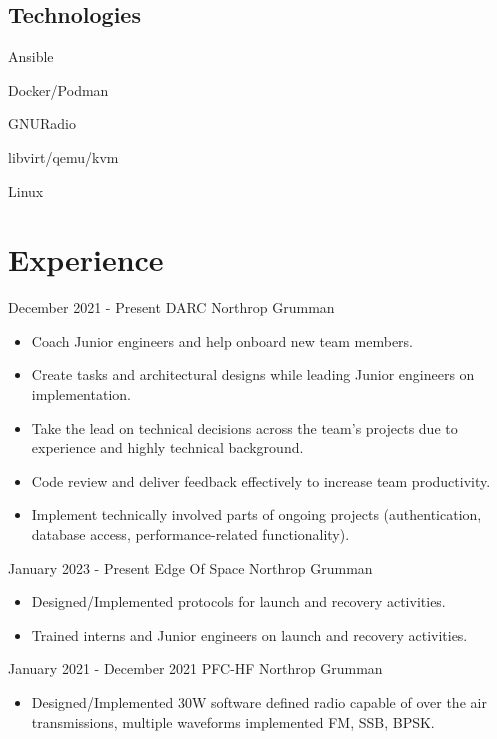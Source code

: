 \documentclass[]{src/friggeri-cv}
\begin{document}
\begin{aside}
  \section{Technologies}
    \item[\rightarrow]{Ansible}
    \item[\rightarrow]{Docker/Podman}
    \item[\rightarrow]{GNURadio}
    \item[\rightarrow]{libvirt/qemu/kvm}
    \item[\rightarrow]{Linux}
    ~
\end{aside}

\section{Experience}
\begin{entrylist}
  \entry
    {December 2021 - Present}
    {DARC}
    {Northrop Grumman}
    {\begin{itemize}
        \item Coach Junior engineers and help onboard new team members.
        \item Create tasks and architectural designs while leading Junior engineers on implementation.
        \item Take the lead on technical decisions across the team's projects due to experience and highly technical background.
        \item Code review and deliver feedback effectively to increase team productivity.
        \item Implement technically involved parts of ongoing projects (authentication, database access, performance-related functionality).
    \end{itemize}}
  \entry
    {January 2023 - Present}
    {Edge Of Space}
    {Northrop Grumman}
    {\begin{itemize}
        \item Designed/Implemented protocols for launch and recovery activities.
        \item Trained interns and Junior engineers on launch and recovery activities.
    \end{itemize}}
  \entry
    {January 2021 - December 2021}
    {PFC-HF}
    {Northrop Grumman}
    {\begin{itemize}
        \item Designed/Implemented 30W software defined radio capable of over the air transmissions, multiple waveforms implemented FM, SSB, BPSK.

\end{itemize}}
\end{entrylist}
\end{document}
